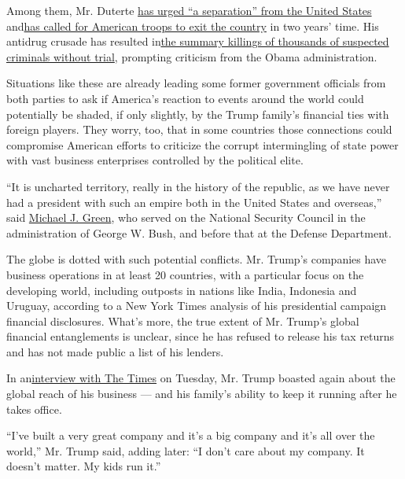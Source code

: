 Among them, Mr. Duterte
\href{http://www.nytimes.com/2016/10/21/world/asia/rodrigo-duterte-philippines-china-xi-jinping.html}{has
urged ``a separation'' from the United States}
and\href{http://www.nytimes.com/2016/10/27/world/asia/philippines-president-rodrigo-duterte-japan.html}{has
called for American troops to exit the country} in two years' time. His
antidrug crusade has resulted
in\href{http://www.nytimes.com/2016/10/29/world/asia/philippines-duterte-mayor-police.html}{the
summary killings of thousands of suspected criminals without trial},
prompting criticism from the Obama administration.

Situations like these are already leading some former government
officials from both parties to ask if America's reaction to events
around the world could potentially be shaded, if only slightly, by the
Trump family's financial ties with foreign players. They worry, too,
that in some countries those connections could compromise American
efforts to criticize the corrupt intermingling of state power with vast
business enterprises controlled by the political elite.

``It is uncharted territory, really in the history of the republic, as
we have never had a president with such an empire both in the United
States and overseas,'' said
\href{https://www.csis.org/people/michael-j-green}{Michael J. Green},
who served on the National Security Council in the administration of
George W. Bush, and before that at the Defense Department.

The globe is dotted with such potential conflicts. Mr. Trump's companies
have business operations in at least 20 countries, with a particular
focus on the developing world, including outposts in nations like India,
Indonesia and Uruguay, according to a New York Times analysis of his
presidential campaign financial disclosures. What's more, the true
extent of Mr. Trump's global financial entanglements is unclear, since
he has refused to release his tax returns and has not made public a list
of his lenders.

In
an\href{http://www.nytimes.com/2016/11/23/us/politics/trump-new-york-times-interview-transcript.html}{interview
with The Times} on Tuesday, Mr. Trump boasted again about the global
reach of his business --- and his family's ability to keep it running
after he takes office.

``I've built a very great company and it's a big company and it's all
over the world,'' Mr. Trump said, adding later: ``I don't care about my
company. It doesn't matter. My kids run it.''

